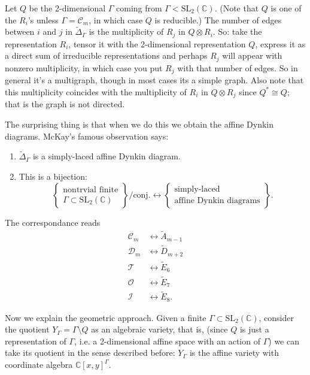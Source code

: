 Let $Q$ be the 2-dimensional $\Gamma$ coming
from
$\Gamma<\text{SL}_2(\mathbb{C})$.
(Note that $Q$ is one of the $R_i$'s unless
$\Gamma=\mathcal{C}_m$,
in which case $Q$ is reducible.)
The number of edges between $i$ and $j$ in
$\tilde{\Delta}_\Gamma$
is the multiplicity of $R_j$ in $Q \otimes
R_i$.
So: take the representation $R_i$, tensor it
with the
2-dimensional representation $Q$,
express it as a direct sum of irreducible
representations
and perhaps $R_j$ will appear with nonzero
multiplicity,
in which case you put $R_j$ with that number
of edges.
So in general it's a multigraph, though in
most
cases its a simple graph.
Also note that this multiplicity coincides
with the multiplicity of $R_i$ in $Q \otimes
R_j$
since $Q^* \cong Q$; that is the graph is not
directed.

The surprising thing is that when we do this
we obtain
the affine Dynkin diagrams. McKay's famous
observation says:
\begin{enumerate}
\item $\tilde{\Delta}_\Gamma$ is a
simply-laced affine Dynkin
diagram.

\item This is a bijection:
$$
\left\{\substack{\text{nontrvial finite} \\
\Gamma \subset
\text{SL}_2(\mathbb{C})}\right\}\Big/
\text{conj.}
\leftrightarrow
\left\{\substack{\text{simply-laced} \\
\text{affine Dynkin diagrams}}\right\}.
$$
\end{enumerate}

\noindent
The correspondance reads
$$
\begin{aligned}
\mathcal{C}_m &\leftrightarrow
\widetilde{A}_{m-1}\\
\mathcal{D}_m &\leftrightarrow
\widetilde{D}_{m+2}\\
\mathcal{T}&\leftrightarrow\tilde{E}
_6\\
\mathcal{O}&\leftrightarrow\tilde{E}
_7\\
\mathcal{I}&\leftrightarrow\tilde{E}
_8.
\end{aligned}
$$

\medskip\noindent
Now we explain the geometric approach.
Given a finite $\Gamma \subset
\text{SL}_2(\mathbb{C})$, consider
the quotient $Y_\Gamma=\Gamma\setminus Q$ as
an algebraic variety,
that is, (since $Q$ is just a representation
of $\Gamma$, i.e.
a 2-dimensional affine space with an action
of $\Gamma$)
we can take its quotient in the sense
described before:
$Y_\Gamma$ is the affine variety with
coordinate algebra
$\mathbb{C}[x,y]^\Gamma$.

